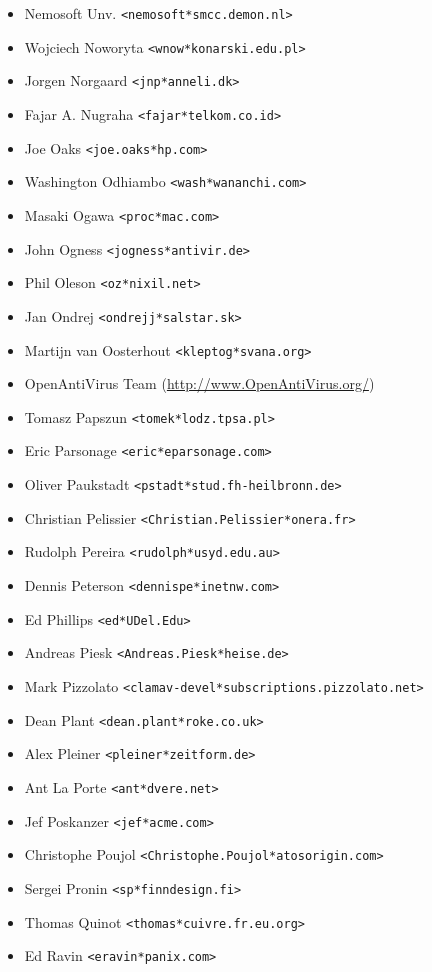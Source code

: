 \documentclass[a4paper,titlepage,12pt]{article}
\newcommand{\email}[1]{\texttt{#1}}
\begin{document}
\begin{itemize}
	\item Nemosoft Unv. \email{<nemosoft*smcc.demon.nl>}
	\item Wojciech Noworyta \email{<wnow*konarski.edu.pl>}
	\item Jorgen Norgaard \email{<jnp*anneli.dk>}
	\item Fajar A. Nugraha \email{<fajar*telkom.co.id>}
	\item Joe Oaks \email{<joe.oaks*hp.com>}
	\item Washington Odhiambo \email{<wash*wananchi.com>}
	\item Masaki Ogawa \email{<proc*mac.com>}
	\item John Ogness \email{<jogness*antivir.de>}
	\item Phil Oleson \email{<oz*nixil.net>}
	\item Jan Ondrej \email{<ondrejj*salstar.sk>}
	\item Martijn van Oosterhout \email{<kleptog*svana.org>}
	\item OpenAntiVirus Team (\url{http://www.OpenAntiVirus.org/})
	\item Tomasz Papszun \email{<tomek*lodz.tpsa.pl>}
	\item Eric Parsonage \email{<eric*eparsonage.com>}
	\item Oliver Paukstadt \email{<pstadt*stud.fh-heilbronn.de>}
	\item Christian Pelissier \email{<Christian.Pelissier*onera.fr>}
	\item Rudolph Pereira \email{<rudolph*usyd.edu.au>}
	\item Dennis Peterson \email{<dennispe*inetnw.com>}
	\item Ed Phillips \email{<ed*UDel.Edu>}
	\item Andreas Piesk \email{<Andreas.Piesk*heise.de>}
	\item Mark Pizzolato \email{<clamav-devel*subscriptions.pizzolato.net>}
	\item Dean Plant \email{<dean.plant*roke.co.uk>}
	\item Alex Pleiner \email{<pleiner*zeitform.de>}
	\item Ant La Porte \email{<ant*dvere.net>}
	\item Jef Poskanzer \email{<jef*acme.com>}
	\item Christophe Poujol \email{<Christophe.Poujol*atosorigin.com>}
	\item Sergei Pronin \email{<sp*finndesign.fi>}
	\item Thomas Quinot \email{<thomas*cuivre.fr.eu.org>}
	\item Ed Ravin \email{<eravin*panix.com>}

\end{itemize}
\end{document}
